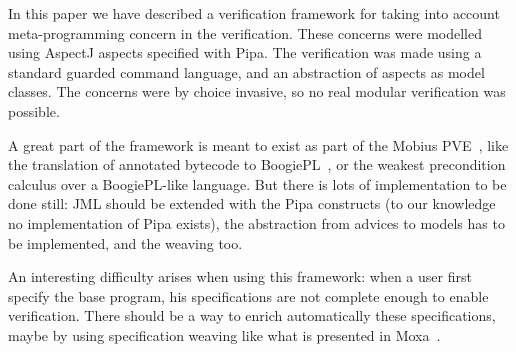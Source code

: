 In this paper we have described a verification framework 
for taking into account meta-programming concern in the verification.
These concerns were modelled using AspectJ aspects specified with Pipa.
The verification was made using a standard guarded command language, and
an abstraction of aspects as model classes.
The concerns were by choice invasive, so no real modular verification was
possible.

A great part of the framework is meant to exist as part of the 
Mobius PVE~\cite{MobiusPVE07}, like the translation of annotated bytecode
to BoogiePL~\cite{javatrans07}, or the weakest precondition calculus
over a BoogiePL-like language. But there is lots of implementation
to be done still: JML should be extended with the Pipa constructs 
(to our knowledge no implementation of Pipa exists), the abstraction
from advices to models has to be implemented, and the weaving too.

An interesting difficulty arises when using this framework: when a user first
specify the base program, his specifications are not complete enough to enable 
verification. There should be a way to enrich automatically these 
specifications, maybe by using specification weaving like what is presented
in Moxa~\cite{moxa05}.